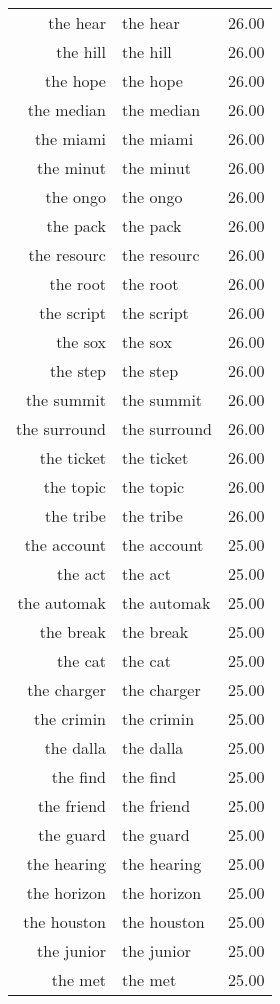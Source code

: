 \begin{table}[ht]
\begin{tabular}{rlr}
  the hear & the hear & 26.00 \\ 
  the hill & the hill & 26.00 \\ 
  the hope & the hope & 26.00 \\ 
  the median & the median & 26.00 \\ 
  the miami & the miami & 26.00 \\ 
  the minut & the minut & 26.00 \\ 
  the ongo & the ongo & 26.00 \\ 
  the pack & the pack & 26.00 \\ 
  the resourc & the resourc & 26.00 \\ 
  the root & the root & 26.00 \\ 
  the script & the script & 26.00 \\ 
  the sox & the sox & 26.00 \\ 
  the step & the step & 26.00 \\ 
  the summit & the summit & 26.00 \\ 
  the surround & the surround & 26.00 \\ 
  the ticket & the ticket & 26.00 \\ 
  the topic & the topic & 26.00 \\ 
  the tribe & the tribe & 26.00 \\ 
  the account & the account & 25.00 \\ 
  the act & the act & 25.00 \\ 
  the automak & the automak & 25.00 \\ 
  the break & the break & 25.00 \\ 
  the cat & the cat & 25.00 \\ 
  the charger & the charger & 25.00 \\ 
  the crimin & the crimin & 25.00 \\ 
  the dalla & the dalla & 25.00 \\ 
  the find & the find & 25.00 \\ 
  the friend & the friend & 25.00 \\ 
  the guard & the guard & 25.00 \\ 
  the hearing & the hearing & 25.00 \\ 
  the horizon & the horizon & 25.00 \\ 
  the houston & the houston & 25.00 \\ 
  the junior & the junior & 25.00 \\ 
  the met & the met & 25.00 \\ 

\end{tabular}
\end{table}
